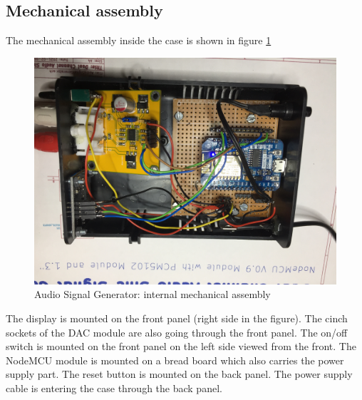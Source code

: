 \documentclass[11pt, oneside]{scrartcl}   	%
\begin{document}
\subsection{Mechanical assembly}
The mechanical assembly inside the case is shown in figure \ref{fig:mechanics}
\begin{figure}[tbph]
	\centering
	\includegraphics[width=\linewidth]{AudioSignalGeneratorTopViewOpened2.jpeg}
	\caption[Audio Signal Generator: internal mechanical assembly]{Audio Signal Generator: internal mechanical assembly}
	\label{fig:mechanics}
\end{figure}
The display is mounted on the front panel (right side in the figure). The cinch sockets of the DAC module are also going through the front panel. The on/off switch is mounted on the front panel on the left side viewed from the front.
The NodeMCU module is mounted on a bread board which also carries the power supply part. The reset button is mounted on the back panel. The power supply cable is entering the case through the back panel.
\newpage
\end{document}
